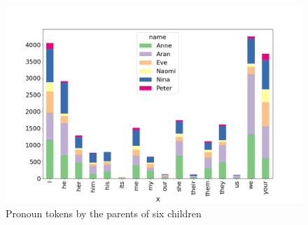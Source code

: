 \FloatBarrier
\begin{figure}[!h]
    \centering
    \includegraphics[scale=0.45]{graph/Stackedbar.png}
    \caption{Pronoun tokens by the parents of six children}
    \label{fig:1}
\end{figure}
\FloatBarrier



